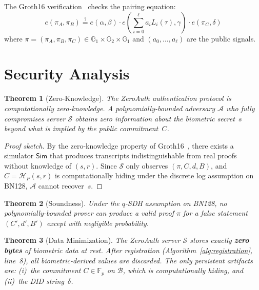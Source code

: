 \documentclass[journal, letterpaper, 10pt]{IEEEtran}
\newtheorem{theorem}{Theorem}
\begin{document}
The Groth16 verification~\cite{groth16} checks the pairing equation:
\begin{equation}
  e(\pi_A, \pi_B) \stackrel{?}{=} e(\alpha, \beta) \cdot e\!\left(\sum_{i=0}^{\ell} a_i L_i(\tau), \gamma\right) \cdot e(\pi_C, \delta)
  \label{eq:groth16}
\end{equation}
where $\pi = (\pi_A, \pi_B, \pi_C) \in \mathbb{G}_1 \times \mathbb{G}_2 \times \mathbb{G}_1$ and $(a_0, \ldots, a_\ell)$ are the public signals.

\section{Security Analysis}
\label{sec:security}

\begin{theorem}[Zero-Knowledge]
\label{thm:zk}
The ZeroAuth authentication protocol is computationally zero-knowledge. A polynomially-bounded adversary $\mathcal{A}$ who fully compromises server $\mathcal{S}$ obtains zero information about the biometric secret~$s$ beyond what is implied by the public commitment~$C$.
\end{theorem}
\begin{proof}[Proof sketch]
By the zero-knowledge property of Groth16~\cite{groth16}, there exists a simulator $\mathsf{Sim}$ that produces transcripts indistinguishable from real proofs without knowledge of $(s, r)$. Since $\mathcal{S}$ only observes $(\pi, C, d, B)$, and $C = \mathcal{H}_P(s,r)$ is computationally hiding under the discrete log assumption on BN128, $\mathcal{A}$ cannot recover~$s$.
\end{proof}

\begin{theorem}[Soundness]
Under the $q$-SDH assumption on BN128, no polynomially-bounded prover can produce a valid proof $\pi$ for a false statement $(C', d', B')$ except with negligible probability.
\end{theorem}

\begin{theorem}[Data Minimization]
The ZeroAuth server $\mathcal{S}$ stores exactly \textbf{zero bytes} of biometric data at rest. After registration (Algorithm~\ref{alg:registration}, line~8), all biometric-derived values are discarded. The only persistent artifacts are: (i)~the commitment $C \in \mathbb{F}_p$ on $\mathcal{B}$, which is computationally hiding, and (ii)~the DID string~$\delta$.
\end{theorem}
\end{document}
